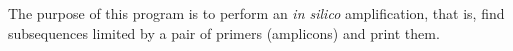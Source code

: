 The purpose of this program is to perform an \textit{in silico}
amplification, that is, find subsequences limited by a pair of primers
(amplicons) and print them.
